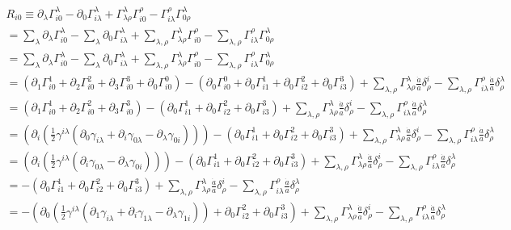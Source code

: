 \documentclass[12pt]{report}
\newcommand{\ch}[2]{\Gamma^{#1}_{#2}}
\newcommand{\p}{\partial}
\begin{document}
\begin{eqnarray*}
R_{i0} \equiv \p_{\lambda}\ch{\lambda}{i0} - \p_{0}\ch{\lambda}{i \lambda} + \ch{\lambda}{\lambda \rho}\ch{\rho}{i0} - \ch{\rho}{i \lambda}\ch{\lambda}{0 \rho}\\
=\sum_\lambda \p_{\lambda}\ch{\lambda}{i0} - \sum_\lambda \p_{0}\ch{\lambda}{i \lambda} + \sum_{\lambda,\rho} \ch{\lambda}{\lambda \rho}\ch{\rho}{i0} -\sum_{\lambda,\rho} \ch{\rho}{i \lambda}\ch{\lambda}{0 \rho}\\
=\sum_\lambda \p_{\lambda}\ch{\lambda}{i0} - \sum_\lambda \p_{0}\ch{\lambda}{i \lambda} + \sum_{\lambda,\rho} \ch{\lambda}{\lambda \rho}\ch{\rho}{i0} -\sum_{\lambda,\rho} \ch{\rho}{i \lambda}\ch{\lambda}{0 \rho}\\
=( \p_{1}\ch{1}{i0}+\p_{2}\ch{2}{i0}+\p_{3}\ch{3}{i0}+\p_{0}\ch{0}{i0}) - (\p_{0}\ch{0}{i 0}+\p_{0}\ch{1}{i 1}+ \p_{0}\ch{2}{i 2} + \p_{0}\ch{3}{i 3}) + \sum_{\lambda,\rho} \ch{\lambda}{\lambda \rho} \frac{\dot{a}}{a } \delta^i_\rho -\sum_{\lambda,\rho} \ch{\rho}{i \lambda} \frac{\dot{a}}{a } \delta^\lambda_\rho\\
=( \p_{1}\ch{1}{i0}+\p_{2}\ch{2}{i0}+\p_{3}\ch{3}{i0}) - (\p_{0}\ch{1}{i 1}+ \p_{0}\ch{2}{i 2} + \p_{0}\ch{3}{i 3}) + \sum_{\lambda,\rho} \ch{\lambda}{\lambda \rho} \frac{\dot{a}}{a } \delta^i_\rho -\sum_{\lambda,\rho} \ch{\rho}{i \lambda} \frac{\dot{a}}{a } \delta^\lambda_\rho\\
=( \p_{i} (\frac{1}{2} \gamma^{i \lambda}(\p_{0} \gamma_{i \lambda}+\p_i  \gamma_{0 \lambda} - \p_\lambda  \gamma_{0i}))) - (\p_{0}\ch{1}{i 1}+ \p_{0}\ch{2}{i 2} + \p_{0}\ch{3}{i 3}) + \sum_{\lambda,\rho} \ch{\lambda}{\lambda \rho} \frac{\dot{a}}{a } \delta^i_\rho -\sum_{\lambda,\rho} \ch{\rho}{i \lambda} \frac{\dot{a}}{a } \delta^\lambda_\rho\\
=( \p_{i} (\frac{1}{2} \gamma^{i \lambda}(\p_i  \gamma_{0 \lambda} - \p_\lambda  \gamma_{0i}))) - (\p_{0}\ch{1}{i 1}+ \p_{0}\ch{2}{i 2} + \p_{0}\ch{3}{i 3}) + \sum_{\lambda,\rho} \ch{\lambda}{\lambda \rho} \frac{\dot{a}}{a } \delta^i_\rho -\sum_{\lambda,\rho} \ch{\rho}{i \lambda} \frac{\dot{a}}{a } \delta^\lambda_\rho\\
= - (\p_{0}\ch{1}{i 1}+ \p_{0}\ch{2}{i 2} + \p_{0}\ch{3}{i 3}) + \sum_{\lambda,\rho} \ch{\lambda}{\lambda \rho} \frac{\dot{a}}{a } \delta^i_\rho -\sum_{\lambda,\rho} \ch{\rho}{i \lambda} \frac{\dot{a}}{a } \delta^\lambda_\rho\\
= - (\p_{0}(\frac{1}{2} \gamma^{i \lambda}(\p_{1} \gamma_{i \lambda}+\p_i  \gamma_{1 \lambda} - \p_\lambda  \gamma_{1i}))+ \p_{0}\ch{2}{i 2} + \p_{0}\ch{3}{i 3}) + \sum_{\lambda,\rho} \ch{\lambda}{\lambda \rho} \frac{\dot{a}}{a } \delta^i_\rho -\sum_{\lambda,\rho} \ch{\rho}{i \lambda} \frac{\dot{a}}{a } \delta^\lambda_\rho\\

\end{eqnarray*}
\end{document}
